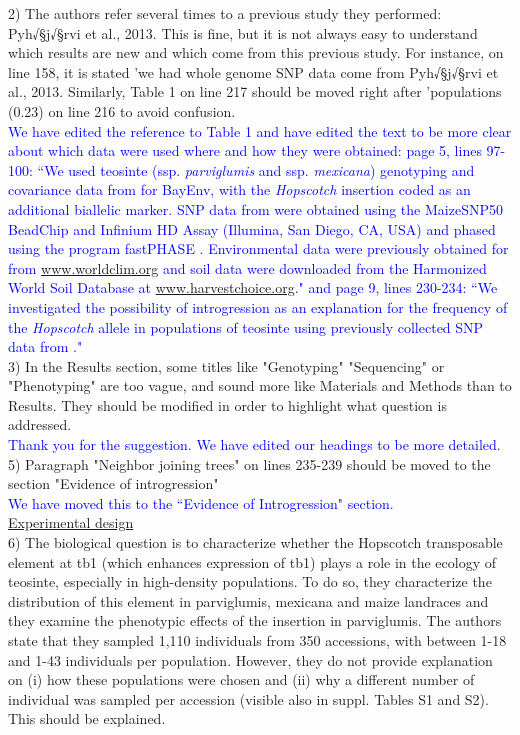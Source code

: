 \documentclass[11pt]{article}
\newcommand{\res}[1]{\noindent \textcolor{blue}{{#1}} \\}
\begin{document}
2) The authors refer several times to a previous study they performed: Pyh√§j√§rvi et al., 2013. This is fine, but it is not always easy to understand which results are new and which come from this previous study. For instance, on line 158, it is stated 'we had whole genome SNP data come from Pyh√§j√§rvi et al., 2013. Similarly, Table 1 on line 217 should be moved right after 'populations (0.23) on line 216 to avoid confusion.\\

\res{We have edited the reference to Table 1 and have edited the text to be more clear about which data were used where and how they were obtained: page 5, lines 97-100: ``We used teosinte (ssp. \emph{parviglumis} and ssp. \emph{mexicana}) genotyping and covariance data from \citet{Pyhajarvi2013} for BayEnv, with the \emph{Hopscotch} insertion coded as an additional biallelic marker. SNP data from \citet{Pyhajarvi2013} were obtained using the MaizeSNP50 BeadChip and Infinium HD Assay (Illumina, San Diego, CA, USA) and phased using the program fastPHASE \citep{Scheet2006}. Environmental data were previously obtained for \citet{Pyhajarvi2013} from \url{www.worldclim.org} and soil data were downloaded from the Harmonized World Soil Database \citep{FAOHWSD} at \url{www.harvestchoice.org}." and page 9, lines 230-234: ``We investigated the possibility of introgression as an explanation for the frequency of the \emph{Hopscotch} allele in populations of teosinte using previously collected SNP data from \citep{Pyhajarvi2013}."}

3) In the Results section, some titles like "Genotyping" "Sequencing" or "Phenotyping" are too vague, and sound more like Materials and Methods than to Results. They should be modified in order to highlight what question is addressed.\\

\res{Thank you for the suggestion. We have edited our headings to be more detailed.}

5) Paragraph "Neighbor joining trees" on lines 235-239 should be moved to the section "Evidence of introgression"\\

\res{We have moved this to the ``Evidence of Introgression" section.}

\underline{Experimental design}\\

6) The biological question is to characterize whether the Hopscotch transposable element at tb1 (which enhances expression of tb1) plays a role in the ecology of teosinte, especially in high-density populations. To do so, they characterize the distribution of this element in parviglumis, mexicana and maize landraces and they examine the phenotypic effects of the insertion in parviglumis.
The authors state that they sampled 1,110 individuals from 350 accessions, with between 1-18 and 1-43 individuals per population. However, they do not provide explanation on (i) how these populations were chosen and (ii) why a different number of individual was sampled per accession (visible also in suppl. Tables S1 and S2). This should be explained.\\
\end{document}
